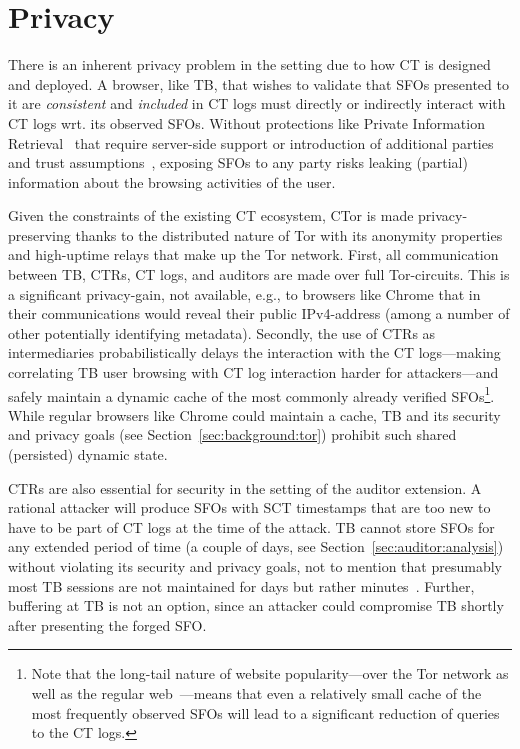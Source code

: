 \section{Privacy} \label{sec:privacy}
There is an inherent privacy problem in the setting due to how CT is designed
and deployed. A browser, like TB, that wishes to validate that SFOs presented to
it are \emph{consistent} and \emph{included} in CT logs must directly or
indirectly interact with CT logs wrt. its observed SFOs. Without protections
like Private Information Retrieval~\cite{PIR} that require server-side support
or introduction of additional parties and trust
assumptions~\cite{lueks-and-goldberg,kales}, exposing SFOs to any party risks
leaking (partial) information about the browsing activities of the user.

Given the constraints of the existing CT ecosystem, CTor is made
privacy-preserving thanks to the distributed nature of Tor with its anonymity
properties and high-uptime relays that make up the Tor network. First, all
communication between TB, CTRs, CT logs, and auditors are made over full
Tor-circuits. This is a significant privacy-gain, not available, e.g., to
browsers like Chrome that in their communications would reveal their public
IPv4-address (among a number of other potentially identifying metadata).
Secondly, the use of CTRs as intermediaries probabilistically delays the
interaction with the CT logs---making correlating TB user browsing with CT log
interaction harder for attackers---and safely maintain a dynamic cache of the
most commonly already verified SFOs\footnote{Note that the long-tail nature of
website popularity---over the Tor network as well as the regular
web~\cite{mani}---means that even a relatively small cache of the most
frequently observed SFOs will lead to a significant reduction of queries to the
CT logs.}. While regular browsers like Chrome could maintain a cache, TB and its
security and privacy goals (see Section~\ref{sec:background:tor}) prohibit such
shared (persisted) dynamic state.

CTRs are also essential for security in the setting of the auditor extension. A
rational attacker will produce SFOs with SCT timestamps that are too new to have
to be part of CT logs at the time of the attack. TB cannot store SFOs for any
extended period of time (a couple of days, see
Section~\ref{sec:auditor:analysis}) without violating its security and privacy
goals, not to mention that presumably most TB sessions are not maintained for
days but rather minutes~\cite{DBLP:conf/pam/AmannS16}. Further, buffering at TB
is not an option, since an attacker could compromise TB shortly after presenting
the forged SFO.


